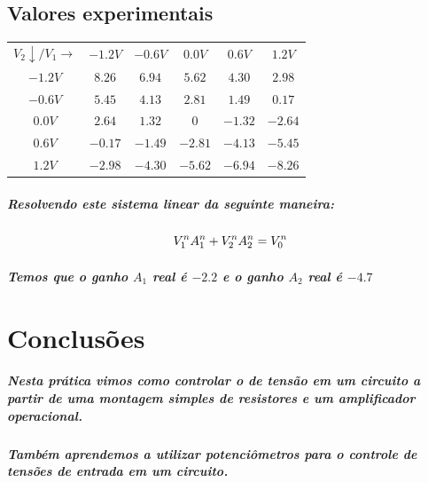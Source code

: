 \documentclass[12pt,twoside, a4paper, twocolumn]{article}
\begin{document}
\subsection{Valores experimentais}

\begin{center}
    \begin{tabular}{ |c|ccccc| }
        \hline
        $V_2 \downarrow / V_1 \rightarrow $ & $-1.2V$ & $-0.6V$ & $0.0V$  & $0.6V$  & $1.2V$  \\
        $-1.2V$                             & $8.26$  & $6.94$  & $5.62$  & $4.30$  & $2.98$  \\
        $ -0.6V$                            & $5.45$  & $4.13$  & $2.81$  & $1.49$  & $0.17$  \\
        $0.0V$                              & $2.64$  & $1.32$  & $0$     & $-1.32$ & $-2.64$ \\
        $ 0.6V$                             & $-0.17$ & $-1.49$ & $-2.81$ & $-4.13$ & $-5.45$ \\
        $ 1.2V$                             & $-2.98$ & $-4.30$ & $-5.62$ & $-6.94$ & $-8.26$ \\
        \hline
    \end{tabular}
\end{center}

\subparagraph*{Resolvendo este sistema linear da seguinte maneira:}

\begin{equation}
    V_1^n A_1^n + V_2^n A_2^n = V_0^n \\
\end{equation}

\subparagraph*{Temos que o ganho $A_1$ real é $-2.2$ e o ganho $A_2$ real é $-4.7$}


\section{Conclusões}

\subparagraph*{Nesta prática vimos como controlar o de tensão em um circuito a partir de uma montagem simples de resistores e um amplificador operacional.}

\subparagraph*{Também aprendemos a utilizar potenciômetros para o controle de tensões de entrada em um circuito.}
\end{document}
